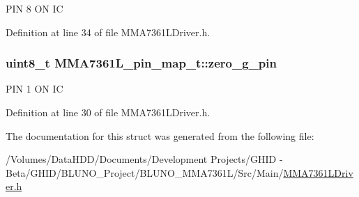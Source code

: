 \begin{DoxyItemize}
\item \-P\-I\-N 8 \-O\-N \-I\-C 
\end{DoxyItemize}

\-Definition at line 34 of file \-M\-M\-A7361\-L\-Driver.\-h.

\hypertarget{struct_m_m_a7361_l__pin__map__t_add1b0dcad336c0c422328c6d2fbb4fb5}{
\subsubsection[{zero\-\_\-g\-\_\-pin}]{\setlength{\rightskip}{0pt plus 5cm}uint8\-\_\-t {\bf \-M\-M\-A7361\-L\-\_\-pin\-\_\-map\-\_\-t\-::zero\-\_\-g\-\_\-pin}}}\label{struct_m_m_a7361_l__pin__map__t_add1b0dcad336c0c422328c6d2fbb4fb5}

\begin{DoxyItemize}
\item \-P\-I\-N 1 \-O\-N \-I\-C 
\end{DoxyItemize}

\-Definition at line 30 of file \-M\-M\-A7361\-L\-Driver.\-h.



\-The documentation for this struct was generated from the following file\-:\begin{DoxyCompactItemize}
\item 
/\-Volumes/\-Data\-H\-D\-D/\-Documents/\-Development Projects/\-G\-H\-I\-D -\/ Beta/\-G\-H\-I\-D/\-B\-L\-U\-N\-O\-\_\-\-Project/\-B\-L\-U\-N\-O\-\_\-\-M\-M\-A7361\-L/\-Src/\-Main/\hyperlink{_m_m_a7361_l_driver_8h}{\-M\-M\-A7361\-L\-Driver.\-h}\end{DoxyCompactItemize}
